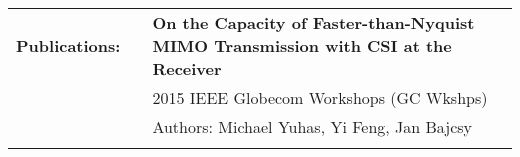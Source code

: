 \documentclass{minimal}
\begin{document}
\begin{tabular}{ p{1.5cm} p{1cm} p{16cm} }
\textbf{Publications:} & & \textbf{On the Capacity of Faster-than-Nyquist MIMO Transmission with CSI at the Receiver}\\
& & 2015 IEEE Globecom Workshops (GC Wkshps)\\
& & Authors: Michael Yuhas, Yi Feng, Jan Bajcsy\\
& & \\
\end{tabular}
\end{document}
